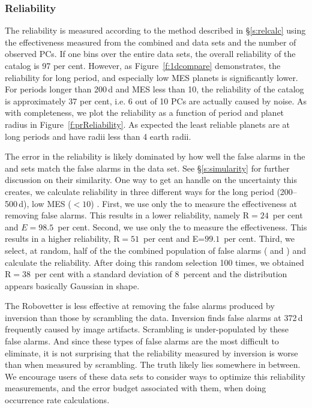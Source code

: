 \subsubsection{Reliability}
\label{s:reliability}
The reliability is measured according to the method described in \S\ref{s:relcalc} using the effectiveness measured from the combined \scrtce{} and \invtce{} data sets and the number of observed PCs.  If one bins over the entire data sets, the overall reliability of the catalog is 97 per cent. However, as Figure~\ref{f:1dcompare} demonstrates, the reliability for long period, and especially low MES planets is significantly lower.  For periods longer than 200\,d and MES less than 10, the reliability of the catalog is approximately 37 per cent, i.e. 6 out of 10 PCs are actually caused by noise. As with completeness, we plot the reliability as a function of period and planet radius in Figure~\ref{f:prReliability}. As expected the least reliable planets are at long periods and have radii less than 4 earth radii. 

The error in the reliability is likely dominated by how well the false alarms in the \scrtce{} and \invtce{} sets match the false alarms in the \opstce{} data set. See \S\ref{s:simularity} for further discussion on their similarity.  One way to get an handle on the uncertainty this creates, we calculate reliability in three different ways for the long period (200--500\,d), low MES ($<10$) .  First, we use only the  to measure the effectiveness at removing false alarms. This results in a lower reliability, namely R$=24$~per cent and $E=98.5$~per cent. Second, we use only the  to measure the effectiveness. This results in a higher reliability, R$=51$~per cent and E=$99.1$~per cent. Third, we select, at random, half of the the combined population of false alarms (\scrtce{} and \invtce{}) and calculate the reliability. After doing this random selection 100 times, we obtained R$=38$~per cent with a standard deviation of 8~percent and the distribution appears basically Gaussian in shape.  

The Robovetter is less effective at removing the false alarms produced by inversion than those by scrambling the data. Inversion finds false alarms at 372\,d frequently caused by image artifacts.  Scrambling is under-populated by these false alarms. And since these types of false alarms are the most difficult to eliminate, it is not surprising that the reliability measured by inversion is worse than when measured by scrambling.  The truth likely lies somewhere in between. We encourage users of these data sets to consider ways to optimize this reliability measurements, and the error budget associated with them, when doing occurrence rate calculations. 


